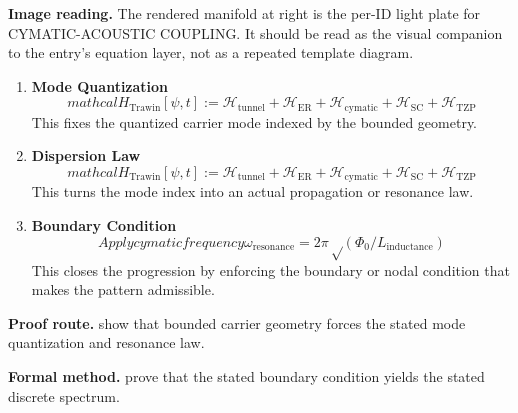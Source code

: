 \begin{samepage}
\noindent\begin{minipage}[t]{0.45\linewidth}
\vspace{0pt}
\raggedright
\scriptsize\textbf{Image reading.} The rendered manifold at right is the per-ID light plate for CYMATIC-ACOUSTIC COUPLING. It should be read as the visual companion to the entry's equation layer, not as a repeated template diagram.\par
\end{minipage}\hfill
\begin{minipage}[t]{0.53\linewidth}
\vspace*{-0.10in}
\raggedright
{}
\end{minipage}
\end{samepage}

\clearpage


\begin{enumerate}[leftmargin=1.6em,itemsep=9pt,topsep=6pt]
\item \textbf{Mode Quantization}
\[
mathcal{H}_{\text{Trawin}}[\psi, t] := \mathcal{H}_{\text{tunnel}} + \mathcal{H}_{\text{ER}} + \mathcal{H}_{\text{cymatic}} + \mathcal{H}_{\text{SC}} + \mathcal{H}_{\text{TZP}}
\]
This fixes the quantized carrier mode indexed by the bounded geometry.

\item \textbf{Dispersion Law}
\[
mathcal{H}_{\text{Trawin}}[\psi, t] := \mathcal{H}_{\text{tunnel}} + \mathcal{H}_{\text{ER}} + \mathcal{H}_{\text{cymatic}} + \mathcal{H}_{\text{SC}} + \mathcal{H}_{\text{TZP}}
\]
This turns the mode index into an actual propagation or resonance law.

\item \textbf{Boundary Condition}
\[
Apply cymatic frequency \omega_{\mathrm{resonance}} = 2π√(\Phi_0/L_{\mathrm{inductance}})
\]
This closes the progression by enforcing the boundary or nodal condition that makes the pattern admissible.
\end{enumerate}

\textbf{Proof route.} show that bounded carrier geometry forces the stated mode quantization and resonance law.

\textbf{Formal method.} prove that the stated boundary condition yields the stated discrete spectrum.

